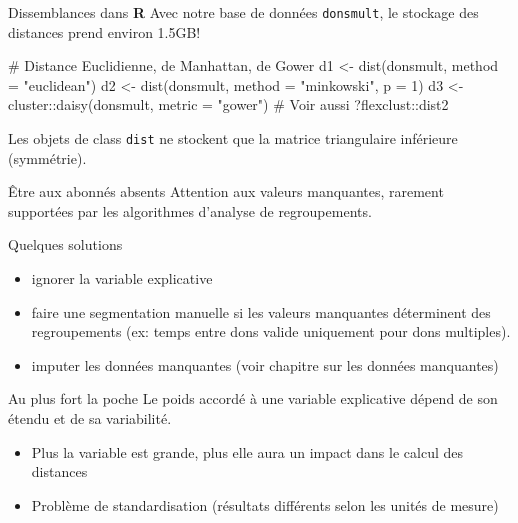 \documentclass[
  ignorenonframetext,
]{beamer}
\newenvironment{Shaded}{\begin{snugshade}}{\end{snugshade}}
\newcommand{\AttributeTok}[1]{\textcolor[rgb]{0.40,0.45,0.13}{#1}}
\newcommand{\CommentTok}[1]{\textcolor[rgb]{0.37,0.37,0.37}{#1}}
\newcommand{\DecValTok}[1]{\textcolor[rgb]{0.68,0.00,0.00}{#1}}
\newcommand{\FunctionTok}[1]{\textcolor[rgb]{0.28,0.35,0.67}{#1}}
\newcommand{\NormalTok}[1]{\textcolor[rgb]{0.00,0.23,0.31}{#1}}
\newcommand{\OtherTok}[1]{\textcolor[rgb]{0.00,0.23,0.31}{#1}}
\newcommand{\SpecialCharTok}[1]{\textcolor[rgb]{0.37,0.37,0.37}{#1}}
\newcommand{\StringTok}[1]{\textcolor[rgb]{0.13,0.47,0.30}{#1}}
\providecommand{\tightlist}{%
  \setlength{\itemsep}{0pt}\setlength{\parskip}{0pt}}\usepackage{longtable,booktabs,array}
\begin{document}
\begin{frame}[fragile]{Dissemblances dans \textbf{R}}
\protect\hypertarget{dissemblances-dans-r}{}
Avec notre base de données \texttt{donsmult}, le stockage des distances
prend environ 1.5GB!

\begin{Shaded}
\begin{Highlighting}[numbers=left,,]
\CommentTok{\# Distance Euclidienne, de Manhattan, de Gower}
\NormalTok{d1 }\OtherTok{\textless{}{-}} \FunctionTok{dist}\NormalTok{(donsmult, }\AttributeTok{method =} \StringTok{"euclidean"}\NormalTok{)}
\NormalTok{d2 }\OtherTok{\textless{}{-}} \FunctionTok{dist}\NormalTok{(donsmult, }\AttributeTok{method =} \StringTok{"minkowski"}\NormalTok{, }\AttributeTok{p =} \DecValTok{1}\NormalTok{)}
\NormalTok{d3 }\OtherTok{\textless{}{-}}\NormalTok{ cluster}\SpecialCharTok{::}\FunctionTok{daisy}\NormalTok{(donsmult, }\AttributeTok{metric =} \StringTok{"gower"}\NormalTok{)}
\CommentTok{\# Voir aussi ?flexclust::dist2}
\end{Highlighting}
\end{Shaded}

\footnotesize

Les objets de class \texttt{dist} ne stockent que la matrice
triangulaire inférieure (symmétrie).
\end{frame}

\begin{frame}{Être aux abonnés absents}
\protect\hypertarget{uxeatre-aux-abonnuxe9s-absents}{}
Attention aux valeurs manquantes, rarement supportées par les
algorithmes d'analyse de regroupements.

Quelques solutions

\begin{itemize}
\tightlist
\item
  ignorer la variable explicative
\item
  faire une segmentation manuelle si les valeurs manquantes déterminent
  des regroupements (ex: temps entre dons valide uniquement pour dons
  multiples).
\item
  imputer les données manquantes (voir chapitre sur les données
  manquantes)
\end{itemize}
\end{frame}

\begin{frame}{Au plus fort la poche}
\protect\hypertarget{au-plus-fort-la-poche}{}
Le poids accordé à une variable explicative dépend de son étendu et de
sa variabilité.

\begin{itemize}
\tightlist
\item
  Plus la variable est grande, plus elle aura un impact dans le calcul
  des distances
\item
  Problème de standardisation (résultats différents selon les unités de
  mesure)
\end{itemize}
\end{frame}
\end{document}
